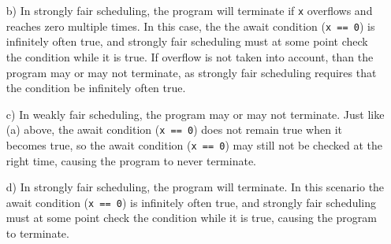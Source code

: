 \documentclass[11pt]{article}
\newcommand{\code}[1]{\texttt{#1}}
\begin{document}
\begin{enumerate}
\begin{enumerate}
	\item[b)] \hspace{0.8cm}In strongly fair scheduling, the program will terminate if \code{x} overflows and reaches zero multiple times. In this case, the the await condition (\code{x == 0}) is infinitely often true, and strongly fair scheduling must at some point check the condition while it is true. If overflow is not taken into account, than the program may or may not terminate, as strongly fair scheduling requires that the condition be infinitely often true.
	
	\item[c)] \hspace{0.8cm}In weakly fair scheduling, the program may or may not terminate. Just like (a) above, the await condition (\code{x == 0}) does not remain true when it becomes true, so the await condition (\code{x == 0}) may still not be checked at the right time, causing the program to never terminate.
	
	\item[d)] \hspace{0.8cm}In strongly fair scheduling, the program will terminate. In this scenario the await condition (\code{x == 0}) is infinitely often true, and strongly fair scheduling must at some point check the condition while it is true, causing the program to terminate.
	
	\end{enumerate}	
\end{enumerate}
\end{document}

